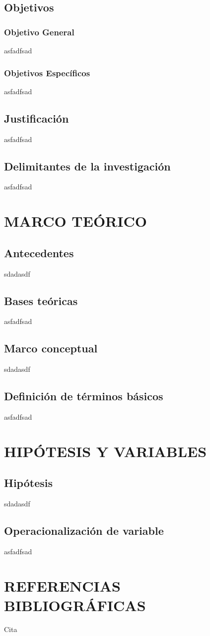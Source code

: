 \documentclass[12pt,a4paper]{article}
\begin{document}
\subsection{Objetivos}
\subsubsection{Objetivo General}
asfadfsad
\subsubsection{Objetivos Específicos}
asfadfsad

\newpage
\subsection{Justificación}
asfadfsad
\subsection{Delimitantes de la investigación}
asfadfsad

\newpage
\section{MARCO TEÓRICO}
\subsection{Antecedentes}
sdadasdf
\subsection{Bases teóricas}
asfadfsad
\subsection{Marco conceptual}
sdadasdf
\subsection{Definición de términos básicos}
asfadfsad

\newpage
\section{HIPÓTESIS Y VARIABLES}
\subsection{Hipótesis}
sdadasdf
\subsection{Operacionalización de variable}
asfadfsad


\newpage
\section{REFERENCIAS BIBLIOGRÁFICAS}

\begin{thebibliography}{4}
 Cita


\end{thebibliography}
\end{document}
